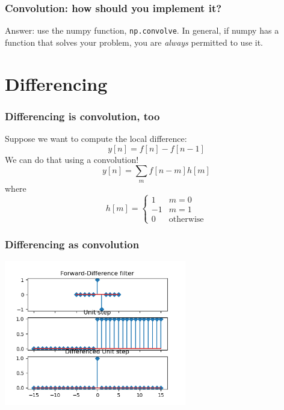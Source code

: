 \documentclass{beamer}
\begin{document}
\begin{frame}
  \frametitle{Convolution: how should you implement it?}
  Answer: use the numpy function, {\tt np.convolve}.  In general, if numpy has a function
  that solves your problem, you are {\em always} permitted to use it.

  \vspace*{2mm}
  
  \centerline{}
\end{frame}
  
\section[Differencing]{Differencing}
\setcounter{subsection}{1}

\begin{frame}
  \frametitle{Differencing is convolution, too}

  Suppose we want to compute the local difference:
  \[
  y[n] = f[n] - f[n-1]
  \]
  We can do that using a convolution!
  \[
  y[n] = \sum_m f[n-m]h[m]
  \]
  where
  \[
  h[m] = \begin{cases}
    1 & m=0\\
    -1 & m=1\\
    0 & \mbox{otherwise}
  \end{cases}
  \]
\end{frame}

\begin{frame}
  \frametitle{Differencing as convolution} 
  \centerline{\includegraphics[height=2.5in]{mp3fig5.png}}
\end{frame}
  
\end{document}
